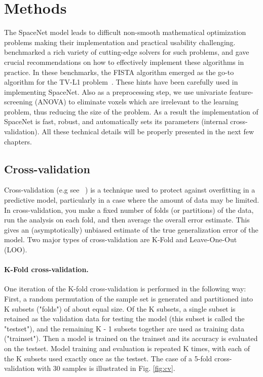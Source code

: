 \section{Methods}
The SpaceNet model leads to difficult non-smooth mathematical optimization problems making their implementation and practical usability challenging.~\citep{dohmatob2014benchmarking} benchmarked a rich variety of cutting-edge solvers for such problems, and gave crucial recommendations on how to effectively implement these algorithms in practice. In these benchmarks, the FISTA algorithm emerged as the go-to algorithm for the TV-L1 problem~\citep{dohmatob2015speeding}. These hints have been carefully used in implementing SpaceNet. Also as a preprocessing step, we use univariate feature-screening (ANOVA) to eliminate voxels which are irrelevant to the learning problem, thus reducing the size of the problem. As a result the implementation of SpaceNet is fast, robust, and automatically sets its parameters (internal cross-validation). All these technical details will be properly presented in the next few chapters.

\subsection{Cross-validation}
Cross-validation (e.g see ~\citep{stone74}) is a technique used to protect against overfitting in a predictive model, particularly in a case where the amount of data may be limited. In cross-validation, you make a fixed number of folds (or partitions) of the data, run the analysis on each fold, and then average the overall error estimate. This gives an (asymptotically) unbiased estimate of the true generalization error of the model. 
Two major types of cross-validation are K-Fold and Leave-One-Out (LOO).

\paragraph{K-Fold cross-validation.}
One iteration of the K-fold cross-validation is performed in the following way: First, a random permutation of the sample set is generated and partitioned into K subsets ("folds") of about equal size. Of the K subsets, a single subset is retained as the validation data for testing the model (this subset is called the "testset"), and the remaining K - 1 subsets together are used as training data ("trainset"). Then a model is trained on the trainset and its accuracy is evaluated on the testset. Model training and evaluation is repeated K times, with each of the K subsets used exactly once as the testset.
The case of a 5-fold cross-validation with 30 samples is illustrated in Fig. \ref{fig:cv}.

